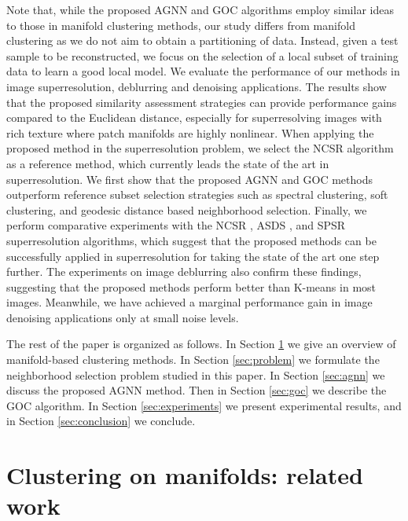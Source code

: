 \documentclass[journal]{IEEEtran}
\begin{document}
Note that, while the proposed AGNN and GOC algorithms employ similar ideas to those in manifold clustering methods, our study differs from manifold clustering as we do not aim to obtain a partitioning of data.  Instead, given a test sample to be reconstructed, we focus on the selection of a local subset of training data to learn a good local model. We evaluate the performance of our methods in image superresolution, deblurring and denoising applications. The results  show that the proposed similarity assessment strategies can provide performance gains compared to the Euclidean distance, especially for superresolving images with rich texture where patch manifolds are highly nonlinear. When applying the proposed method in the superresolution problem, we select the NCSR algorithm \cite{Dong13nonlocally} as a reference method, which currently leads the state of the art in superresolution. 
We first show that the proposed AGNN and GOC methods outperform reference subset selection strategies such as spectral clustering, soft clustering, and geodesic distance based neighborhood selection. Finally, we perform comparative experiments with the NCSR \cite{Dong13nonlocally}, ASDS \cite{Dong11image}, and SPSR \cite{Peleg14a} superresolution algorithms, which suggest that the proposed methods can be successfully applied in superresolution for taking the state of the art one step further. The experiments on image deblurring also confirm these findings, suggesting that the proposed methods perform better than K-means in most images. Meanwhile, we have achieved a marginal performance gain in image denoising applications only at small noise levels.


The rest of the paper is organized as follows. In Section \ref{sec:related_work} we give an overview of manifold-based clustering methods. In Section \ref{sec:problem} we formulate the neighborhood selection problem studied in this paper. In Section \ref{sec:agnn} we discuss the proposed AGNN method. Then in Section \ref{sec:goc} we describe the GOC algorithm. In Section \ref{sec:experiments} we present experimental results, and in Section \ref{sec:conclusion} we conclude. 




\section{Clustering on manifolds: related work}
\label{sec:related_work}
\end{document}
